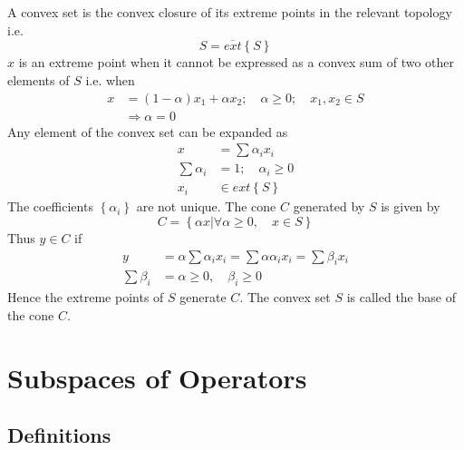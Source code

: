 \documentclass[aps,preprint]{revtex4}%
\begin{document}
A convex set is the convex closure of its extreme points in the relevant
topology i.e.%
\begin{equation}
S=\overline{ext}\left\{  S\right\}
\end{equation}
$x$ is an extreme point when it cannot be expressed as a convex sum of two
other elements of $S$ i.e. when
\begin{align}
x  &  =\left(  1-\alpha\right)  x_{1}+\alpha x_{2};\quad\alpha\geq0;\quad
x_{1},x_{2}\in S\nonumber\\
&  \Longrightarrow\alpha=0
\end{align}
Any element of the convex set can be expanded as
\begin{align}
x  &  =\sum\alpha_{i}x_{i}\\
\sum\alpha_{i}  &  =1;\quad\alpha_{i}\geq0\\
x_{i}  &  \in ext\left\{  S\right\}
\end{align}
The coefficients $\left\{  \alpha_{i}\right\}  $ are not unique. The cone $C$
generated by $S$ is given by
\begin{equation}
C=\left\{  \alpha x|\forall\alpha\geq0,\quad x\in S\right\}
\end{equation}
Thus $y\in C$ if
\begin{align}
y  &  =\alpha\sum\alpha_{i}x_{i}=\sum\alpha\alpha_{i}x_{i}=\sum\beta_{i}%
x_{i}\\
\sum\beta_{i}  &  =\alpha\geq0,\quad\beta_{i}\geq0
\end{align}
Hence the extreme points of $S$ generate $C$. The convex set $S$ is called the
base of the cone $C$.

\section{Subspaces of Operators\label{ideals}}

\subsection{Definitions}
\end{document}
